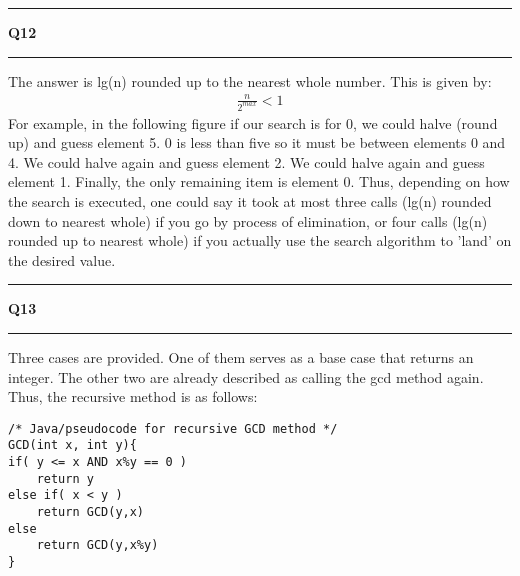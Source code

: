 \documentclass[11pt]{article}
\newcommand\question[2]{\vspace{.25in}\hrule\textbf{#1 #2}\vspace{.5em}\hrule\vspace{.10in}}
\begin{document}
\newpage
\question{Q12}{} 
The answer is lg(n) rounded up to the nearest whole number. This is given by:
\begin{gather*}
\frac{n}{2^{max}} < 1
\end{gather*}
For example, in the following figure if our search is for 0, we could halve (round up) and guess element 5. 0 is less than five so it must be between elements 0 and 4. We could halve again and guess element 2. We could halve again and guess element 1. Finally, the only remaining item is element 0. Thus, depending on how the search is executed, one could say it took at most three calls (lg(n) rounded down to nearest whole) if you go by process of elimination, or four calls (lg(n) rounded up to nearest whole) if you actually use the search algorithm to 'land' on the desired value.
\begin{figure}[!h]
\centering
{}
\end{figure}

\newpage
\question{Q13}{}
Three cases are provided. One of them serves as a base case that returns an integer. The other two are already described as calling the gcd method again. Thus, the recursive method is as follows:
\begin{lstlisting}
/* Java/pseudocode for recursive GCD method */
GCD(int x, int y){
if( y <= x AND x%y == 0 )
	return y	
else if( x < y )
	return GCD(y,x)
else
	return GCD(y,x%y)
}
\end{lstlisting}
\end{document}
